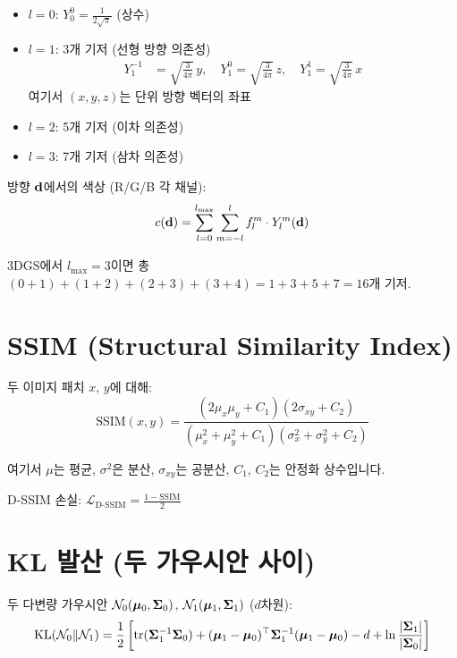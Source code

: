 \documentclass[11pt, a4paper]{report}
\begin{document}
\begin{itemize}[leftmargin=*]
  \item $l = 0$: $Y_0^0 = \frac{1}{2\sqrt{\pi}}$ (상수)
  \item $l = 1$: 3개 기저 (선형 방향 의존성)
  \begin{align}
    Y_1^{-1} &= \sqrt{\tfrac{3}{4\pi}}\, y, \quad
    Y_1^{0} = \sqrt{\tfrac{3}{4\pi}}\, z, \quad
    Y_1^{1} = \sqrt{\tfrac{3}{4\pi}}\, x
  \end{align}
  여기서 $(x, y, z)$는 단위 방향 벡터의 좌표
  \item $l = 2$: 5개 기저 (이차 의존성)
  \item $l = 3$: 7개 기저 (삼차 의존성)
\end{itemize}

방향 $\mathbf{d}$에서의 색상 (R/G/B 각 채널):
\begin{equation}
c(\mathbf{d}) = \sum_{l=0}^{l_{\max}} \sum_{m=-l}^{l} f_l^m \cdot Y_l^m(\mathbf{d})
\end{equation}

3DGS에서 $l_{\max} = 3$이면 총 $(0+1)+(1+2)+(2+3)+(3+4) = 1+3+5+7 = 16$개 기저.


\section{SSIM (Structural Similarity Index)}
\label{sec:ssim}

두 이미지 패치 $x$, $y$에 대해:
\begin{equation}
\text{SSIM}(x, y) = \frac{(2\mu_x \mu_y + C_1)(2\sigma_{xy} + C_2)}{(\mu_x^2 + \mu_y^2 + C_1)(\sigma_x^2 + \sigma_y^2 + C_2)}
\end{equation}

여기서 $\mu$는 평균, $\sigma^2$은 분산, $\sigma_{xy}$는 공분산, $C_1$, $C_2$는 안정화 상수입니다.

D-SSIM 손실: $\mathcal{L}_{\text{D-SSIM}} = \frac{1 - \text{SSIM}}{2}$


\section{KL 발산 (두 가우시안 사이)}
\label{sec:kl}

두 다변량 가우시안 $\mathcal{N}_0(\bm{\mu}_0, \bm{\Sigma}_0)$, $\mathcal{N}_1(\bm{\mu}_1, \bm{\Sigma}_1)$ ($d$차원):
\begin{equation}
\text{KL}(\mathcal{N}_0 \| \mathcal{N}_1) = \frac{1}{2}\left[ \mathrm{tr}(\bm{\Sigma}_1^{-1}\bm{\Sigma}_0) + (\bm{\mu}_1 - \bm{\mu}_0)^\top \bm{\Sigma}_1^{-1}(\bm{\mu}_1 - \bm{\mu}_0) - d + \ln\frac{|\bm{\Sigma}_1|}{|\bm{\Sigma}_0|} \right]
\end{equation}
\end{document}
